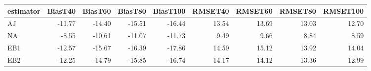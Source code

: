 \begin{table}[ht]
\centering
\begin{tabular}{lrrrrrrrr}
  \toprule
estimator & BiasT40 & BiasT60 & BiasT80 & BiasT100 & RMSET40 & RMSET60 & RMSET80 & RMSET100 \\ 
  \midrule
AJ & -11.77 & -14.40 & -15.51 & -16.44 & 13.54 & 13.69 & 13.03 & 12.70 \\ 
  NA & -8.55 & -10.61 & -11.07 & -11.73 & 9.49 & 9.66 & 8.84 & 8.59 \\ 
  EB1 & -12.57 & -15.67 & -16.39 & -17.86 & 14.59 & 15.12 & 13.92 & 14.04 \\ 
  EB2 & -12.25 & -14.79 & -15.85 & -16.74 & 14.17 & 14.12 & 13.36 & 12.99 \\ 
   \bottomrule
\end{tabular}
\end{table}
